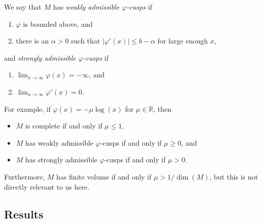 \documentclass[10pt,a4paper]{amsart}
\numberwithin{equation}{section}
\newcommand{\R}{\mathbb{R}}
\begin{document}
We say that $M$ has
\emph{weakly admissible $\varphi$-cusps} if
\begin{enumerate}\itemsep=0pt
\item[(1)] $\varphi$ is bounded above, and
\item[(2)] there is an $\alpha>0$ such that $|\varphi'(x)| \leq b - \alpha$ for large enough $x$,
\end{enumerate}
and
\emph{strongly admissible $\varphi$-cusps} if
\begin{enumerate}\itemsep=0pt
\item[(1)] $\lim_{x \to \infty} \varphi(x) =-\infty$, and
\item[(2)] $\lim_{x \to \infty} \varphi'(x) =0$.
\end{enumerate}
For example, if $\varphi(x) = -\mu \log(x)$ for $\mu \in \R$, then
\begin{itemize}\itemsep=0pt
\item $M$ is complete if and only if $\mu \leq 1$,
\item $M$ has weakly admissible $\varphi$-cusps if and only if $\mu \geq 0$, and
\item $M$ has strongly admissible $\varphi$-cusps if and only if $\mu > 0$.
\end{itemize}
Furthermore, $M$ has finite volume if and only if $\mu>1/\dim(M)$, but this is not directly relevant to us here.

\subsection*{Results}
\end{document}
